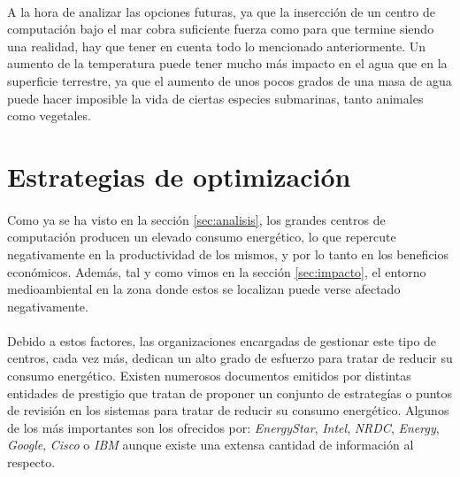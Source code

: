\documentclass[12pt]{article}
\begin{document}
        \paragraph{}
        A la hora de analizar las opciones futuras, ya que la insercción de un centro de computación bajo el mar cobra suficiente fuerza como para que termine siendo una realidad, hay que tener en cuenta todo lo mencionado anteriormente. Un aumento de la temperatura puede tener mucho más impacto en el agua que en la superficie terrestre, ya que el aumento de unos pocos grados de una masa de agua puede hacer imposible la vida de ciertas especies submarinas, tanto animales como vegetales.



  \section{Estrategias de optimización}
	\label{sec:estrategias}

  	\paragraph{}
		Como ya se ha visto en la sección \ref{sec:analisis}, los grandes centros de computación producen un elevado consumo energético, lo que repercute negativamente en la productividad de los mismos, y por lo tanto en los beneficios económicos. Además, tal y como vimos en la sección \ref{sec:impacto}, el entorno medioambiental en la zona donde estos se localizan puede verse afectado negativamente.


		\paragraph{}
		Debido a estos factores, las organizaciones encargadas de gestionar este tipo de centros, cada vez más, dedican un alto grado de esfuerzo para tratar de reducir su consumo energético. Existen numerosos documentos emitidos por distintas entidades de prestigio que tratan de proponer un conjunto de estrategías o puntos de revisión en los sistemas para tratar de reducir su consumo energético. Algunos de los más importantes son los ofrecidos por: \emph{EnergyStar}\cite{energy-star:guide}, \emph{Intel}\cite{intel:guide}, \emph{NRDC}\cite{nrdc:guide}, \emph{Energy}\cite{energy:guide}, \emph{Google}\cite{google:case_study}, \emph{Cisco}\cite{cisco:guide} o  \emph{IBM}\cite{ibm:guide} aunque existe una extensa cantidad de información al respecto.
\end{document}

